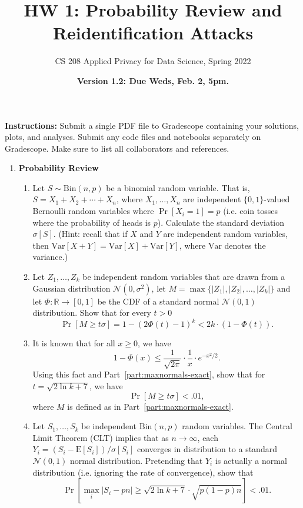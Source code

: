 \documentclass[11pt]{article}
\title{\vspace{-1.5cm} HW 1:  Probability Review and Reidentification Attacks}
\author{CS 208 Applied Privacy for Data Science, Spring 2022}
\date{\textbf{Version 1.2: Due Weds, Feb. 2, 5pm.}}
\newcommand{\Var}{\mathrm{Var}}
\newcommand{\Exp}{\mathrm{E}}
\newcommand{\R}{\mathbb{R}}
\newcommand{\Normal}{\mathcal{N}}
\newcommand{\Bin}{\mathrm{Bin}}
\begin{document}
\maketitle


\vspace{-5ex}

\noindent \textbf{Instructions:} Submit a single PDF file to Gradescope containing your solutions, plots, and analyses. Submit any code files and notebooks separately on Gradescope.  
Make sure to list all collaborators and references.

\begin{enumerate}[leftmargin=*]

\item \textbf{Probability Review}

\begin{enumerate}
    \item  Let $S\sim \Bin(n,p)$ be a binomial random variable.  That is, $S=X_1+X_2+\cdots+X_n$, where 
    $X_1,\ldots,X_n$ are independent $\{0,1\}$-valued Bernoulli random variables where $\Pr[X_i = 1]=p$ (i.e. coin tosses where the probability of heads is $p$).  Calculate the standard deviation $\sigma[S]$.  (Hint: recall that if $X$ and $Y$ are independent random variables, then $\Var[X+Y]=\Var[X]+\Var[Y]$, where $\Var$ denotes the variance.)
    
    \item Let $Z_1,\ldots,Z_k$ be independent random variables that are drawn from a Gaussian distribution $\Normal(0, \sigma^2)$, let $M=\max\{|Z_1|,|Z_2|,\ldots,|Z_k|\}$ and let $\Phi : \R\rightarrow [0,1]$ be the CDF of a standard normal $\Normal(0,1)$ distribution.  Show that for every $t>0$
    $$\Pr[M \geq t\sigma ] = 1- (2\Phi(t)-1)^k < 2k\cdot (1-\Phi(t)).$$
    \label{part:maxnormals-exact}
    
    \item It is known that for all $x\geq 0$, we have 
    $$1-\Phi(x) \leq \frac{1}{\sqrt{2\pi}}\cdot \frac{1}{x}\cdot e^{-x^2/2}.$$
    Using this fact and Part~\ref{part:maxnormals-exact}, show that for $t = \sqrt{2\ln k+7}$, we have
    $$\Pr[M \geq t\sigma] < .01,$$
    where $M$ is defined as in Part~\ref{part:maxnormals-exact}.
    
    \item Let $S_1,\ldots,S_k$ be independent $\Bin(n,p)$ random variables.  The Central Limit Theorem (CLT) implies that as $n\rightarrow \infty$, each $Y_i=(S_i-\Exp[S_i])/\sigma[S_i]$ converges in distribution to a standard $\Normal(0,1)$ normal distribution. Pretending that $Y_i$ is actually a normal distribution (i.e. ignoring the rate of convergence), show that
    $$\Pr\left[\max_i |S_i-pn| \geq \sqrt{2\ln k + 7} \cdot\sqrt{p(1-p) n}\right] < .01.$$
    

\end{enumerate}
\end{enumerate}
\end{document}
